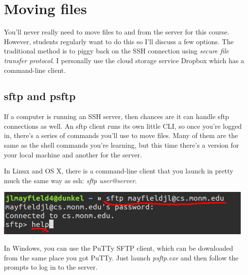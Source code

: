 \documentclass[nobib]{tufte-handout}
\begin{document}
\section{Moving files}

You'll never really need to move files to and from the server for this course.  However, students regularly want to do this so I'll discuss a few options.  The traditional method is to piggy back on the SSH connection using \textit{secure file transfer protocol}. I personally use the cloud storage service Dropbox which has a command-line client.

\subsection{sftp and psftp}

If a computer is running an SSH server, then chances are it can handle sftp connections as well.  An sftp client runs its own little CLI, so once you're logged in, there's a series of commands you'll use to move files. Many of them are the same as the shell commands you're learning, but this time there's a version for your local machine and another for the server.

In Linux and OS X, there is a command-line client that you launch in pretty much the same way as ssh: \textit{sftp user@server}.

\vspace{.1in}
\begin{center}
\includegraphics[scale=.5]{linux-sftplogin.png}
\end{center}
\vspace{.1in}

In Windows, you can use the PuTTy SFTP client, which can be downloaded from the same place you got PuTTy. Just launch \textit{psftp.exe} and then follow the prompts to log in to the server.
\end{document}
